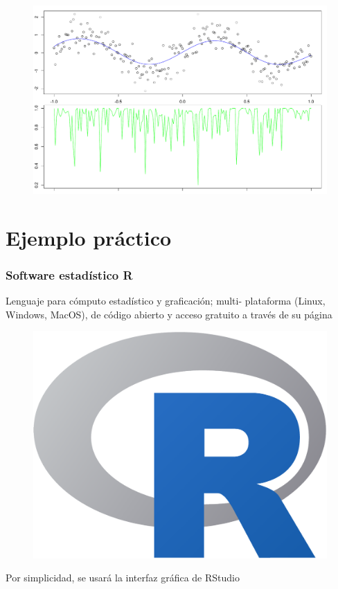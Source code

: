 \documentclass[11pt]{beamer}
\begin{document}

\begin{frame}[fragile]
\begin{figure}[h]
\includegraphics[width=\linewidth]{./img_old/stl_demo2_1.pdf} 
\end{figure}
\end{frame}


\section{Ejemplo pr\'actico}

\begin{frame}\frametitle{Software estad\'istico R}

Lenguaje para c\'omputo estad\'istico y graficaci\'on; multi- plataforma (Linux, Windows, MacOS), 
de c\'odigo abierto y acceso gratuito a trav\'es de su p\'agina
\href{https://www.r-project.org/}{}

\begin{figure}
\centering
\includegraphics[width=0.4\linewidth]{./curso_scripts/r_logo.pdf}
\end{figure}

Por simplicidad, se usar\'a la interfaz gr\'afica de RStudio
\href{https://www.rstudio.com/}{}
\end{frame}
\end{document}
